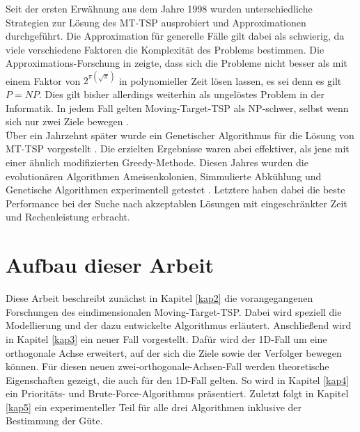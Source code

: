 \documentclass[german,version-2019-11]{uzl-thesis}
\begin{document}
Seit der ersten Erwähnung aus dem Jahre 1998 wurden unterschiedliche Strategien zur Lösung des MT-TSP ausprobiert und Approximationen durchgeführt. Die Approximation für generelle Fälle gilt dabei als schwierig, da viele verschiedene Faktoren die Komplexität des Problems bestimmen. Die Approximations-Forschung in \cite{hammar} zeigte, dass sich die Probleme nicht besser als mit einem Faktor von $2^{\pi(\sqrt{\pi})}$ in polynomieller Zeit lösen lassen, es sei denn es gilt $P=NP$. Dies gilt bisher allerdings weiterhin als ungelöstes Problem in der Informatik. In jedem Fall gelten Moving-Target-TSP als NP-schwer, selbst wenn sich nur zwei Ziele bewegen \cite{hammar}.\\
Über ein Jahrzehnt später wurde ein Genetischer Algorithmus für die Lösung von MT-TSP vorgestellt \cite{choubey2013moving}. Die erzielten Ergebnisse waren abei effektiver, als jene mit einer ähnlich modifizierten Greedy-Methode. Diesen Jahres wurden die evolutionären Algorithmen  \cite{weicker2015evolutionare} Ameisenkolonien, Simmulierte Abkühlung und Genetische Algorithmen experimentell getestet \cite{moraes}. Letztere haben dabei die beste Performance bei der Suche nach akzeptablen Lösungen mit eingeschränkter Zeit und Rechenleistung erbracht.

\section{Aufbau dieser Arbeit}
Diese Arbeit beschreibt zunächst in Kapitel \ref{kap2} die vorangegangenen Forschungen des eindimensionalen Moving-Target-TSP. Dabei wird speziell die Modellierung und der dazu entwickelte Algorithmus erläutert. Anschließend wird in Kapitel \ref{kap3} ein neuer Fall vorgestellt. Dafür wird der 1D-Fall um eine orthogonale Achse erweitert, auf der sich die Ziele sowie der Verfolger bewegen können. Für diesen neuen zwei-orthogonale-Achsen-Fall werden theoretische Eigenschaften gezeigt, die auch für den 1D-Fall gelten. So wird in Kapitel \ref{kap4} ein Prioritäts- und Brute-Force-Algorithmus präsentiert. Zuletzt folgt in Kapitel \ref{kap5} ein experimenteller Teil für alle drei Algorithmen inklusive der Bestimmung der Güte.

\end{document}
